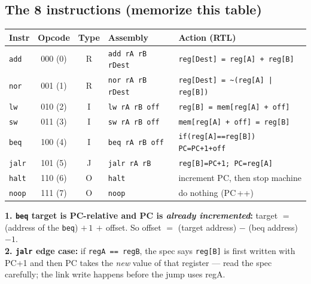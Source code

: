 \documentclass[10pt]{article}
\newcommand{\code}[1]{\texttt{\small #1}}
\begin{document}
\subsection{The 8 instructions (memorize this table)}
\begin{center}
\renewcommand{\arraystretch}{1.25}
\begin{tabular}{@{}l c c l l@{}}
\toprule
\textbf{Instr} & \textbf{Opcode} & \textbf{Type} & \textbf{Assembly} & \textbf{Action (RTL)}\\
\midrule
\code{add}  & 000 (0) & R & \code{add rA rB rDest}  & \code{reg[Dest] = reg[A] + reg[B]}\\
\code{nor}  & 001 (1) & R & \code{nor rA rB rDest}  & \code{reg[Dest] = \~{}(reg[A] | reg[B])}\\
\code{lw}   & 010 (2) & I & \code{lw rA rB off}     & \code{reg[B] = mem[reg[A] + off]}\\
\code{sw}   & 011 (3) & I & \code{sw rA rB off}     & \code{mem[reg[A] + off] = reg[B]}\\
\code{beq}  & 100 (4) & I & \code{beq rA rB off}    & \code{if(reg[A]==reg[B]) PC=PC+1+off}\\
\code{jalr} & 101 (5) & J & \code{jalr rA rB}       & \code{reg[B]=PC+1; PC=reg[A]}\\
\code{halt} & 110 (6) & O & \code{halt}             & increment PC, then stop machine\\
\code{noop} & 111 (7) & O & \code{noop}             & do nothing (PC$\,$++)\\
\bottomrule
\end{tabular}
\end{center}

\begin{keybox}
\textbf{1. \code{beq} target is PC-relative and PC is \emph{already incremented}:} target $=$
(address of the \code{beq}) $+\,1\,+\,$offset. So offset $=$ (target address) $-$ (beq address) $-1$.\\
\textbf{2. \code{jalr} edge case:} if \code{regA == regB}, the spec says \code{reg[B]} is first
written with PC+1 and then PC takes the \emph{new} value of that register --- read the spec
carefully; the link write happens before the jump uses regA.
\end{keybox}
\end{document}
